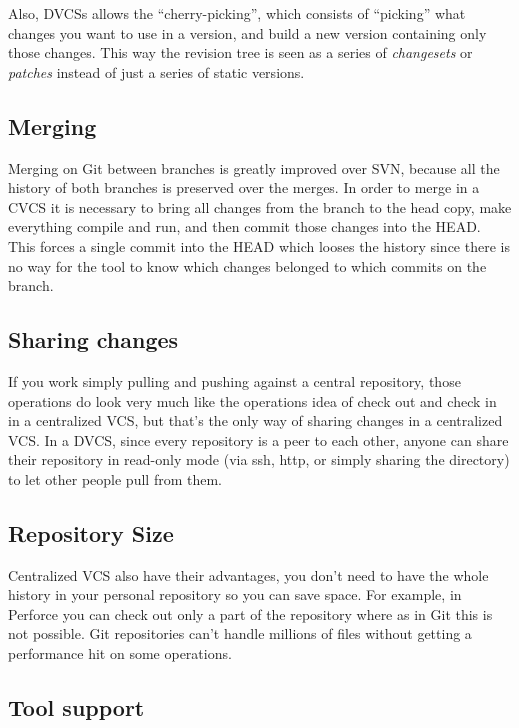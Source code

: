 \documentclass[a4paper,10pt]{article}
\begin{document}
Also, DVCSs allows the ``cherry-picking'', 
which consists of ``picking'' what changes you want to use in a version, and build 
a new version containing only those changes. This way the revision tree is seen as a 
series of \emph{changesets} or \emph{patches} instead of just a series of static versions.

\subsection{Merging}
Merging on Git between branches is greatly improved over SVN, because all the history of 
both branches is preserved over the merges. In order to merge in a CVCS it is necessary to bring all changes from the
branch to the head copy, make everything compile and run, and then commit those changes into the HEAD. This forces
a single commit into the HEAD which looses the history since there is no way for the tool to know which changes belonged
to which commits on the branch.

\subsection{Sharing changes}
If you work simply pulling and pushing against a central repository, those operations do look 
very much like the operations idea of check out and check in in a centralized VCS, 
but that's the only way of sharing changes in a centralized VCS.
In a DVCS, since every repository is a peer to each other, anyone can share their repository in 
read-only mode (via ssh, http, or simply sharing the directory) to let other people pull from them. 

\subsection{Repository Size}

Centralized VCS also have their advantages, you don't need to have the whole history in your 
personal repository so you can save space. For example, in Perforce you can check out only a part of the 
repository\cite{perforceclientspec} where as in Git this is not possible.
Git repositories can't handle millions of files without getting a performance hit on some operations\cite{linusgit}.

\subsection{Tool support}
\end{document}
